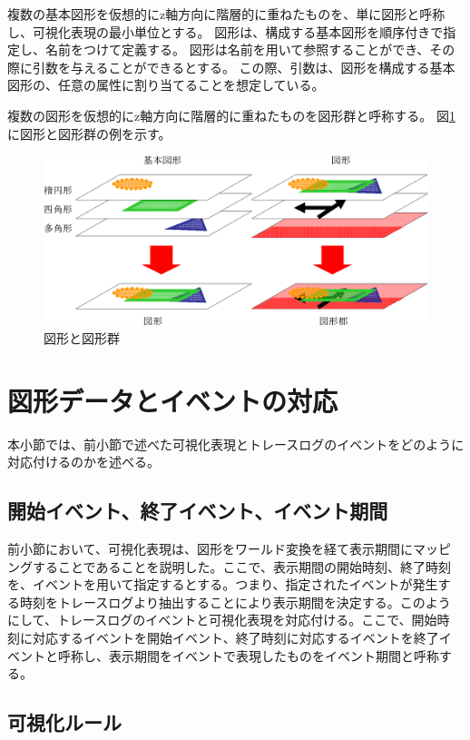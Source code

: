 複数の基本図形を仮想的にz軸方向に階層的に重ねたものを、単に図形と呼称し、可視化表現の最小単位とする。
図形は、構成する基本図形を順序付きで指定し、名前をつけて定義する。
図形は名前を用いて参照することができ、その際に引数を与えることができるとする。
この際、引数は、図形を構成する基本図形の、任意の属性に割り当てることを想定している。

複数の図形を仮想的にz軸方向に階層的に重ねたものを図形群と呼称する。
図\ref{fig:shapes}に図形と図形群の例を示す。

\begin{figure}[tb]
\begin{center}
\includegraphics[scale=0.75]{shapes.eps}
\caption{図形と図形群}
\label{fig:shapes}
\end{center}
\end{figure}

\section{図形データとイベントの対応}

本小節では、前小節で述べた可視化表現とトレースログのイベントをどのように対応付けるのかを述べる。

\subsection{開始イベント、終了イベント、イベント期間}
前小節において、可視化表現は、図形をワールド変換を経て表示期間にマッピ
ングすることであることを説明した。ここで、表示期間の開始時刻、終了時刻
を、イベントを用いて指定するとする。つまり、指定されたイベントが発生す
る時刻をトレースログより抽出することにより表示期間を決定する。このよう
にして、トレースログのイベントと可視化表現を対応付ける。ここで、開始時
刻に対応するイベントを開始イベント、終了時刻に対応するイベントを終了イ
ベントと呼称し、表示期間をイベントで表現したものをイベント期間と呼称す
る。

\subsection{可視化ルール}

